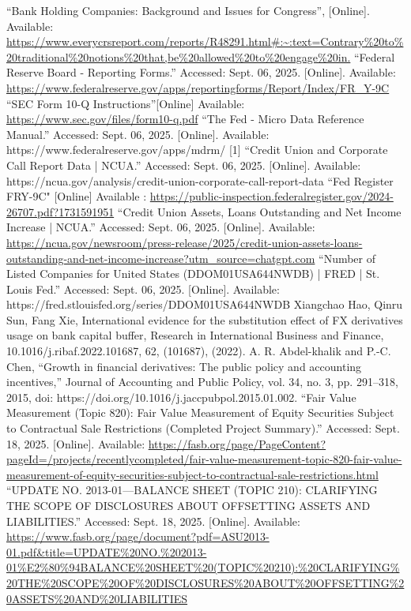 \documentclass[conference]{IEEEtran}
\begin{document}
\begin{thebibliography}{00}
 “Bank Holding Companies: Background and Issues for Congress”, [Online]. Available: \url{https://www.everycrsreport.com/reports/R48291.html#:~:text=Contrary%20to%20traditional%20notions%20that,be%20allowed%20to%20engage%20in.}
 “Federal Reserve Board - Reporting Forms.” Accessed: Sept. 06, 2025. [Online]. Available: \url{https://www.federalreserve.gov/apps/reportingforms/Report/Index/FR_Y-9C}
 ``SEC Form 10-Q Instructions''[Online] Available: \url{https://www.sec.gov/files/form10-q.pdf} 
 “The Fed - Micro Data Reference Manual.” Accessed: Sept. 06, 2025. [Online]. Available: https://www.federalreserve.gov/apps/mdrm/
 [1] “Credit Union and Corporate Call Report Data | NCUA.” Accessed: Sept. 06, 2025. [Online]. Available: https://ncua.gov/analysis/credit-union-corporate-call-report-data
 ``Fed Register FRY-9C" [Online] Available : \url{https://public-inspection.federalregister.gov/2024-26707.pdf?1731591951}
 “Credit Union Assets, Loans Outstanding and Net Income Increase | NCUA.” Accessed: Sept. 06, 2025. [Online]. Available:\url{ https://ncua.gov/newsroom/press-release/2025/credit-union-assets-loans-outstanding-and-net-income-increase?utm_source=chatgpt.com}
 “Number of Listed Companies for United States (DDOM01USA644NWDB) | FRED | St. Louis Fed.” Accessed: Sept. 06, 2025. [Online]. Available: https://fred.stlouisfed.org/series/DDOM01USA644NWDB
 Xiangchao Hao, Qinru Sun, Fang Xie, International evidence for the substitution effect of FX derivatives usage on bank capital buffer, Research in International Business and Finance, 10.1016/j.ribaf.2022.101687, 62, (101687), (2022).
 A. R. Abdel-khalik and P.-C. Chen, “Growth in financial derivatives: The public policy and accounting incentives,” Journal of Accounting and Public Policy, vol. 34, no. 3, pp. 291–318, 2015, doi: https://doi.org/10.1016/j.jaccpubpol.2015.01.002.
 “Fair Value Measurement (Topic 820): Fair Value Measurement of Equity Securities Subject to Contractual Sale Restrictions (Completed Project Summary).” Accessed: Sept. 18, 2025. [Online]. Available: \url {https://fasb.org/page/PageContent?pageId=/projects/recentlycompleted/fair-value-measurement-topic-820-fair-value-measurement-of-equity-securities-subject-to-contractual-sale-restrictions.html}
 “UPDATE NO. 2013-01—BALANCE SHEET (TOPIC 210): CLARIFYING THE SCOPE OF DISCLOSURES ABOUT OFFSETTING ASSETS AND LIABILITIES.” Accessed: Sept. 18, 2025. [Online]. Available: \url{https://www.fasb.org/page/document?pdf=ASU2013-01.pdf&title=UPDATE%20NO.%202013-01%E2%80%94BALANCE%20SHEET%20(TOPIC%20210):%20CLARIFYING%20THE%20SCOPE%20OF%20DISCLOSURES%20ABOUT%20OFFSETTING%20ASSETS%20AND%20LIABILITIES}

\end{thebibliography}
\end{document}
